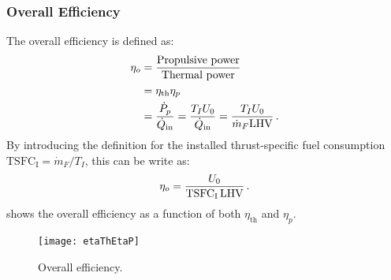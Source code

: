 \subsubsection{Overall Efficiency}
The overall efficiency is defined as:
\begin{equation}
\begin{split}
  \eta_o &= {\frac{\text{Propulsive power}}{\text{Thermal power}}}\\
             &= \eta_\text{th} \eta_p\\
             &= {\frac{\dot{P}_p}{\dot{Q}_\text{in}}} = {\frac{T_I U_0}{\dot{Q}_\text{in}}} = {\frac{T_I U_0}{\dot{m}_F \text{LHV}}}\,.
\end{split}
\end{equation}
By introducing the definition for the installed thrust-specific fuel consumption $\text{TSFC}_\text{I} = \dot{m}_F/{T_I}$, this can be write as:
\begin{equation}
  \eta_o = {\frac{U_0}{\text{TSFC}_\text{I}\, \text{LHV}}}\,.
\end{equation}
 shows the overall efficiency as a function of both $\eta_\text{th}$ and $\eta_p$.

\begin{figure}[!htb!]
  \begin{center}
    \texttt{[image: etaThEtaP]}
    \caption{\label{fig:ETA_OVERALL}Overall efficiency.}
  \end{center}
\end{figure}


